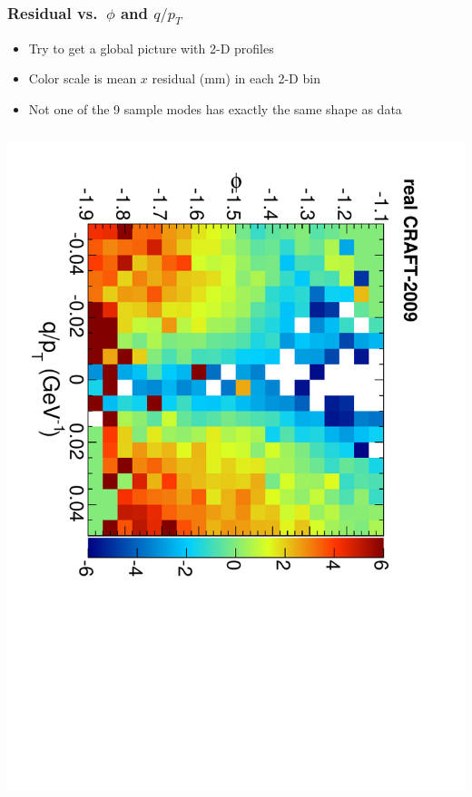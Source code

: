 \documentclass[compress]{beamer}
\begin{document}
\begin{frame}
\frametitle{Residual vs.~$\phi$ and $q/p_T$}

\begin{itemize}
\item Try to get a global picture with 2-D profiles
\item Color scale is mean $x$ residual (mm) in each 2-D bin
\item Not one of the 9 sample modes has exactly the same shape as data
\end{itemize}

\begin{columns}
\includegraphics[height=\linewidth, angle=90]{residx-phi-qoverpt_real.pdf}


\end{columns}
\end{frame}
\end{document}
